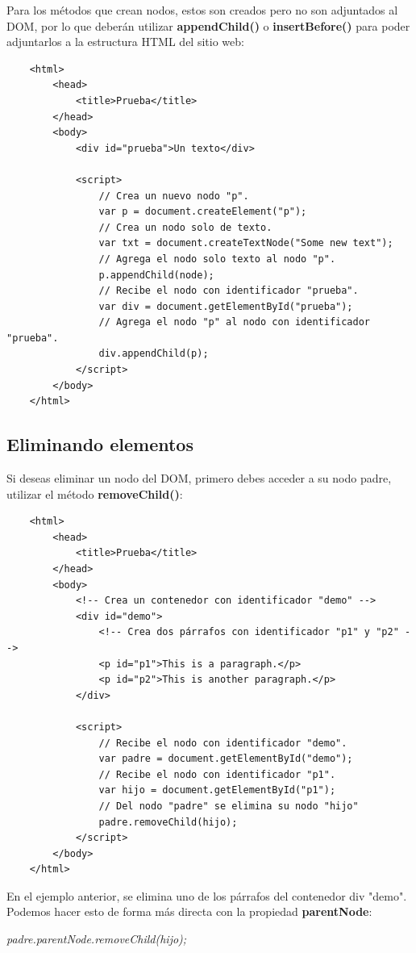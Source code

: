 Para los métodos que crean nodos, estos son creados pero no son adjuntados al DOM, por lo que deberán utilizar \textbf{appendChild()} o \textbf{insertBefore()} para poder adjuntarlos a la estructura HTML del sitio web:
\begin{lstlisting}
    <html>
        <head>
            <title>Prueba</title>
        </head>
        <body>
            <div id="prueba">Un texto</div>
            
            <script>
                // Crea un nuevo nodo "p".
                var p = document.createElement("p");
                // Crea un nodo solo de texto.
                var txt = document.createTextNode("Some new text");
                // Agrega el nodo solo texto al nodo "p".
                p.appendChild(node);
                // Recibe el nodo con identificador "prueba".
                var div = document.getElementById("prueba");
                // Agrega el nodo "p" al nodo con identificador "prueba".
                div.appendChild(p);
            </script>
        </body>
    </html>
\end{lstlisting}


\subsection{Eliminando elementos}
\hspace{0.55cm}Si deseas eliminar un nodo del DOM, primero debes acceder a su nodo padre, utilizar el método \textbf{removeChild()}:
\begin{lstlisting}
    <html>
        <head>
            <title>Prueba</title>
        </head>
        <body>
            <!-- Crea un contenedor con identificador "demo" -->
            <div id="demo">
                <!-- Crea dos párrafos con identificador "p1" y "p2" -->
                <p id="p1">This is a paragraph.</p>
                <p id="p2">This is another paragraph.</p>
            </div>
            
            <script>
                // Recibe el nodo con identificador "demo".
                var padre = document.getElementById("demo");
                // Recibe el nodo con identificador "p1".
                var hijo = document.getElementById("p1");
                // Del nodo "padre" se elimina su nodo "hijo"
                padre.removeChild(hijo);
            </script>
        </body>
    </html>
\end{lstlisting}

En el ejemplo anterior, se elimina uno de los párrafos del contenedor div "demo". Podemos hacer esto de forma más directa con la propiedad \textbf{parentNode}:
\begin{center}
    \textit{padre.parentNode.removeChild(hijo);}
\end{center}


